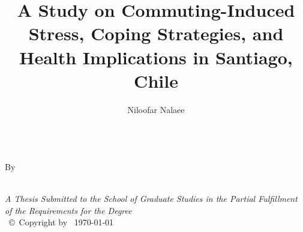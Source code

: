 \documentclass[
11pt, %
oneside, %
english, %
singlespacing, %
]{macthesis} %
\title{A Study on Commuting-Induced Stress, Coping Strategies, and Health Implications in Santiago, Chile}
\author{Niloofar Nalaee}
\date{}
\begin{document}
\sloppy

\frontmatter %

\pagestyle{plain} %

\vspace{6cm}
\begin{center}
\ttitle
\end{center}
\clearpage

\begin{center}

\vfill
\textsc{\Large \ttitle}\\[1 cm]

By  \\[1 cm]
{\authorname\, \bdeg }


 \vfill
{\large \textit{A Thesis Submitted to the School of Graduate Studies in the Partial Fulfillment of the Requirements for the Degree \degreename}}\\

\vfill
{\large \univname\, \copyright\, Copyright by \authorname\, \today}\\[4cm] %

\end{center}
\clearpage

\newpage
{} %
\setcounter{page}{2} %
\end{document}
